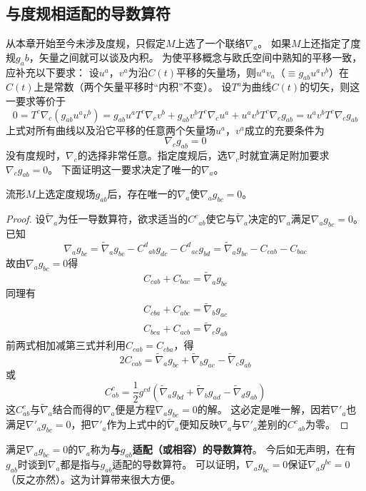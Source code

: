 \subsection{与度规相适配的导数算符}
从本章开始至今未涉及度规，只假定$M$上选了一个联络$\nabla_a$。
如果$M$上还指定了度规$g_ab$，矢量之间就可以谈及内积。
为使平移概念与欧氏空间中熟知的平移一致，应补充以下要求：
设$u^a$，$v^a$为沿$C(t)$平移的矢量场，则$u^av_a$（$\equiv g_{ab}u^av^b$）在$C(t)$上是常数（两个矢量平移时``内积''不变）。
设$T^a$为曲线$C(t)$的切矢，则这一要求等价于
$$0 = T^c\nabla_c(g_{ab}u^av^b) = g_{ab}u^aT^c\nabla_cv^b + g_{ab}v^bT^c\nabla_cu^a + u^av^bT^c\nabla_cg_{ab} = u^av^bT^c\nabla_cg_{ab}$$
上式对所有曲线以及沿它平移的任意两个矢量场$u^a$，$v^a$成立的充要条件为
$$\nabla_cg_{ab} = 0$$
没有度规时，$\nabla_c$的选择非常任意。指定度规后，选$\nabla_c$时就宜满足附加要求$\nabla_cg_{ab} = 0$。
下面证明这一要求决定了唯一的$\nabla_a$。

\begin{theorem}
流形$M$上选定度规场$g_{ab}$后，存在唯一的$\nabla_a$使$\nabla_ag_{bc} = 0$。
\end{theorem}

\begin{proof}
设$\tilde\nabla_a$为任一导数算符，欲求适当的$C^c{}_{ab}$使它与$\tilde\nabla_a$决定的$\nabla_a$满足$\nabla_ag_{bc} = 0$。
已知$$\nabla_ag_{bc} = \tilde\nabla_ag_{bc} - C^d{}_{ab}g_{dc} - C^d{}_{ac}g_{bd} = \tilde\nabla_ag_{bc} - C_{cab} - C_{bac}$$
故由$\nabla_ag_{bc} = 0$得$$C_{cab} + C_{bac} = \tilde\nabla_ag_{bc}$$
同理有\begin{gather*}
C_{cba} + C_{abc} = \tilde\nabla_bg_{ac} \\
C_{bca} + C_{acb} = \tilde\nabla_cg_{ab}
\end{gather*}
前两式相加减第三式并利用$C_{cab} = C_{cba}$，得
$$2C_{cab} = \tilde\nabla_ag_{bc} + \tilde\nabla_bg_{ac} - \tilde\nabla_cg_{ab}$$
或
$$C^c_{ab} = \frac{1}{2}g^{cd}(\tilde\nabla_ag_{bd} + \tilde\nabla_bg_{ad} - \tilde\nabla_dg_{ab})$$
这$C^c_{ab}$与$\tilde\nabla_a$结合而得的$\nabla_a$便是方程$\nabla_ag_{bc} = 0$的解。
这必定是唯一解，因若$\nabla'_a$也满足$\nabla'_ag_{bc} = 0$，把$\nabla'_a$作为上式中的$\tilde\nabla_a$便知反映$\nabla_a$与$\nabla'_a$差别的$C^c{}_{ab}$为零。
\end{proof}

满足$\nabla_ag_{bc} = 0$的$\nabla_a$称为\textbf{与$g_{ab}$适配（或相容）的导数算符}。
今后如无声明，在有$g_{ab}$时谈到$\nabla_a$都是指与$g_{ab}$适配的导数算符。
可以证明，$\nabla_ag_{bc} = 0$保证$\nabla_ag^{bc} = 0$（反之亦然）。这为计算带来很大方便。

